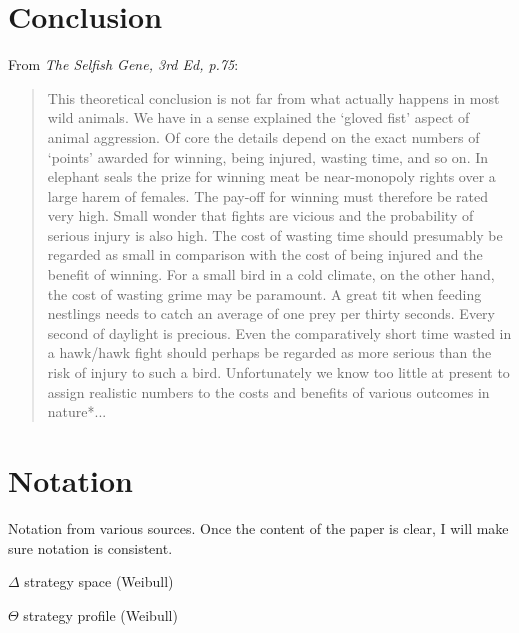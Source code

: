 \section{Conclusion}
From \emph{The Selfish Gene, 3rd Ed, p.75}:
\begin{quote}
This theoretical conclusion is not far from what actually happens in most wild animals. We have in a sense explained the `gloved fist' aspect of animal aggression. Of core the details depend on the exact numbers of `points' awarded for winning, being injured, wasting time, and so on. In elephant seals the prize for winning meat be near-monopoly rights over a large harem of females. The pay-off for winning must therefore be rated very high. Small wonder that fights are vicious and the probability of serious injury is also high. The cost of wasting time should presumably be regarded as small in comparison with the cost of being injured and the benefit of winning. For a small bird in a cold climate, on the other hand, the cost of wasting grime may be paramount. A great tit when feeding nestlings needs to catch an average of one prey per thirty seconds. Every second of daylight is precious. Even the comparatively short time wasted in a hawk/hawk fight should perhaps be regarded as more serious than the risk of injury to such a bird. Unfortunately we know too little at present to assign realistic numbers to the costs and benefits of various outcomes in nature*...
\end{quote}

\section{Notation}
Notation from various sources. Once the content of the paper is clear, I will make sure notation is consistent. 

$\Delta$ strategy space (Weibull)

$\Theta$ strategy profile (Weibull)









